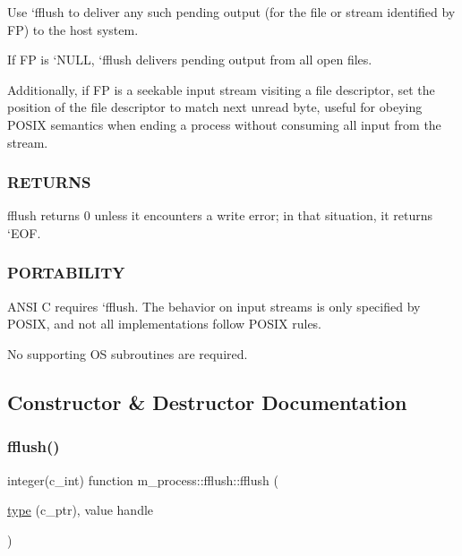 Use `fflush\textquotesingle{} to deliver any such pending output (for the file or stream identified by FP) to the host system.

If FP is `\+N\+U\+LL\textquotesingle{}, `fflush\textquotesingle{} delivers pending output from all open files.

Additionally, if FP is a seekable input stream visiting a file descriptor, set the position of the file descriptor to match next unread byte, useful for obeying P\+O\+S\+IX semantics when ending a process without consuming all input from the stream. \subsubsection*{R\+E\+T\+U\+R\+NS}

fflush returns \textquotesingle{}0\textquotesingle{} unless it encounters a write error; in that situation, it returns `\+E\+OF\textquotesingle{}. \subsubsection*{P\+O\+R\+T\+A\+B\+I\+L\+I\+TY}

A\+N\+SI C requires `fflush\textquotesingle{}. The behavior on input streams is only specified by P\+O\+S\+IX, and not all implementations follow P\+O\+S\+IX rules.

No supporting OS subroutines are required. 

\subsection{Constructor \& Destructor Documentation}
\mbox{\label{interfacem__process_1_1fflush_a77d0db933d548b3ee20b064e705a408e}} 
\subsubsection{\texorpdfstring{fflush()}{fflush()}}
{\footnotesize\ttfamily integer(c\+\_\+int) function m\+\_\+process\+::fflush\+::fflush (\begin{DoxyParamCaption}\item[{\hyperlink{stop__watch_83_8txt_a70f0ead91c32e25323c03265aa302c1c}{type} (c\+\_\+ptr), value}]{handle }\end{DoxyParamCaption})\hspace{0.3cm}{\ttfamily [private]}}




